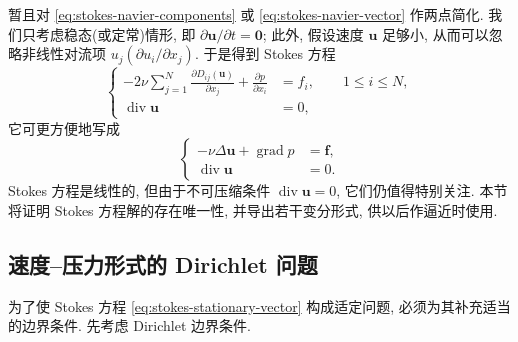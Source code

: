 暂且对 \eqref{eq:stokes-navier-components} 或
\eqref{eq:stokes-navier-vector} 作两点简化. 我们只考虑稳态(或定常)情形,
即 $\partial\mathbf{u}/\partial t=\mathbf{0}$; 此外, 假设速度
$\mathbf{u}$ 足够小, 从而可以忽略非线性对流项
$u_j(\partial u_i/\partial x_j)$. 于是得到 Stokes 方程
\begin{equation}\label{eq:stokes-stationary-strain}
\left\{
\begin{aligned}
-2\nu\sum_{j=1}^{N}
\frac{\partial D_{ij}(\mathbf{u})}{\partial x_j}
+\frac{\partial p}{\partial x_i}
&=f_i,\qquad 1\le i\le N,\\
\operatorname{div}\mathbf{u}&=0,
\end{aligned}
\right.
\end{equation}
它可更方便地写成
\begin{equation}\label{eq:stokes-stationary-vector}
\left\{
\begin{aligned}
-\nu\Delta\mathbf{u}+\operatorname{grad}p&=\mathbf{f},\\
\operatorname{div}\mathbf{u}&=0.
\end{aligned}
\right.
\end{equation}
Stokes 方程是线性的, 但由于不可压缩条件
$\operatorname{div}\mathbf{u}=0$, 它们仍值得特别关注.
本节将证明 Stokes 方程解的存在唯一性, 并导出若干变分形式,
供以后作逼近时使用.

\subsection{速度--压力形式的 Dirichlet 问题}
\label{subsec:stokes-dirichlet-velocity-pressure}

为了使 Stokes 方程 \eqref{eq:stokes-stationary-vector} 构成适定问题,
必须为其补充适当的边界条件. 先考虑 Dirichlet 边界条件.

